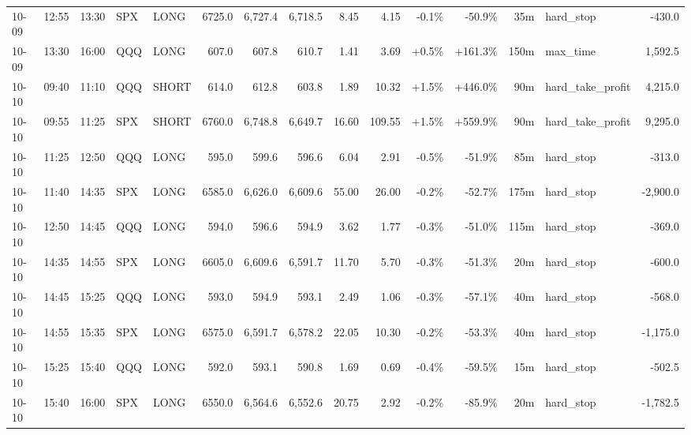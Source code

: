 \documentclass[11pt,a4paper,twoside]{article}
\begin{document}
\begin{landscape}
\begin{center}
\begin{longtable}{>{\color{txtmain}}l l l l l r r r r r r r r >{\color{txtmain}}l r}
10-09 & 12:55 & 13:30 & SPX & LONG & 6725.0 & 6,727.4 & 6,718.5 & 8.45 & 4.15 & \textcolor{lossred}{-0.1\%} & \textcolor{lossred}{-50.9\%} & 35m & hard\_stop & \textcolor{lossred}{-430.0} \\
10-09 & 13:30 & 16:00 & QQQ & LONG & 607.0 & 607.8 & 610.7 & 1.41 & 3.69 & \textcolor{wingreen}{+0.5\%} & \textcolor{wingreen}{+161.3\%} & 150m & max\_time & \textcolor{wingreen}{1,592.5} \\
10-10 & 09:40 & 11:10 & QQQ & SHORT & 614.0 & 612.8 & 603.8 & 1.89 & 10.32 & \textcolor{wingreen}{+1.5\%} & \textcolor{wingreen}{+446.0\%} & 90m & hard\_take\_profit & \textcolor{wingreen}{4,215.0} \\
10-10 & 09:55 & 11:25 & SPX & SHORT & 6760.0 & 6,748.8 & 6,649.7 & 16.60 & 109.55 & \textcolor{wingreen}{+1.5\%} & \textcolor{wingreen}{+559.9\%} & 90m & hard\_take\_profit & \textcolor{wingreen}{9,295.0} \\
10-10 & 11:25 & 12:50 & QQQ & LONG & 595.0 & 599.6 & 596.6 & 6.04 & 2.91 & \textcolor{lossred}{-0.5\%} & \textcolor{lossred}{-51.9\%} & 85m & hard\_stop & \textcolor{lossred}{-313.0} \\
10-10 & 11:40 & 14:35 & SPX & LONG & 6585.0 & 6,626.0 & 6,609.6 & 55.00 & 26.00 & \textcolor{lossred}{-0.2\%} & \textcolor{lossred}{-52.7\%} & 175m & hard\_stop & \textcolor{lossred}{-2,900.0} \\
10-10 & 12:50 & 14:45 & QQQ & LONG & 594.0 & 596.6 & 594.9 & 3.62 & 1.77 & \textcolor{lossred}{-0.3\%} & \textcolor{lossred}{-51.0\%} & 115m & hard\_stop & \textcolor{lossred}{-369.0} \\
10-10 & 14:35 & 14:55 & SPX & LONG & 6605.0 & 6,609.6 & 6,591.7 & 11.70 & 5.70 & \textcolor{lossred}{-0.3\%} & \textcolor{lossred}{-51.3\%} & 20m & hard\_stop & \textcolor{lossred}{-600.0} \\
10-10 & 14:45 & 15:25 & QQQ & LONG & 593.0 & 594.9 & 593.1 & 2.49 & 1.06 & \textcolor{lossred}{-0.3\%} & \textcolor{lossred}{-57.1\%} & 40m & hard\_stop & \textcolor{lossred}{-568.0} \\
10-10 & 14:55 & 15:35 & SPX & LONG & 6575.0 & 6,591.7 & 6,578.2 & 22.05 & 10.30 & \textcolor{lossred}{-0.2\%} & \textcolor{lossred}{-53.3\%} & 40m & hard\_stop & \textcolor{lossred}{-1,175.0} \\
10-10 & 15:25 & 15:40 & QQQ & LONG & 592.0 & 593.1 & 590.8 & 1.69 & 0.69 & \textcolor{lossred}{-0.4\%} & \textcolor{lossred}{-59.5\%} & 15m & hard\_stop & \textcolor{lossred}{-502.5} \\
10-10 & 15:40 & 16:00 & SPX & LONG & 6550.0 & 6,564.6 & 6,552.6 & 20.75 & 2.92 & \textcolor{lossred}{-0.2\%} & \textcolor{lossred}{-85.9\%} & 20m & hard\_stop & \textcolor{lossred}{-1,782.5} \\

\end{longtable}
\end{center}
\end{landscape}
\end{document}

